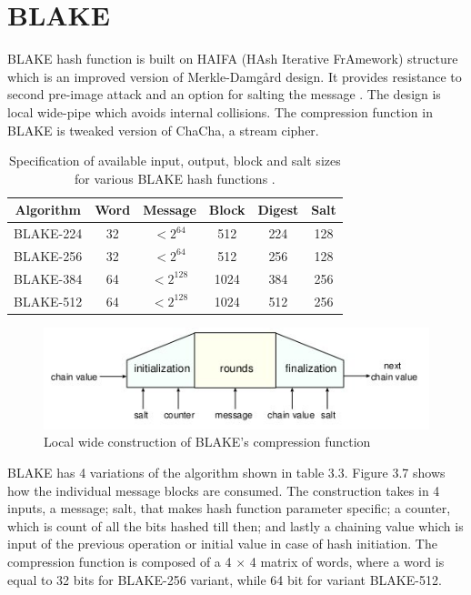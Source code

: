 \newpage
\section{BLAKE} 

BLAKE \cite{00002} hash function is built on HAIFA (HAsh Iterative FrAmework) structure \cite{00020} which is an improved
version of Merkle-Damg\r{a}rd design. It provides resistance to second pre-image attack and an option for salting the message
\cite{00021}. The design is local wide-pipe which avoids internal collisions. The compression function in BLAKE is tweaked
version of ChaCha, a stream cipher. 

\begin{table}[h]
  \begin{center}
    \begin{tabular}{ *{6}{c} } \hline
      Algorithm & Word & Message     & Block & Digest & Salt \\ \hline
      BLAKE-224 & 32   & $< 2^{64}$  & 512   & 224    & 128  \\
      BLAKE-256 & 32   & $< 2^{64}$  & 512   & 256    & 128  \\
      BLAKE-384 & 64   & $< 2^{128}$ & 1024  & 384    & 256  \\
      BLAKE-512 & 64   & $< 2^{128}$ & 1024  & 512    & 256  \\ \hline
    \end{tabular}
    \caption{Specification of available input, output, block and salt sizes for various BLAKE hash functions \cite{00002}.}
  \end{center}
\end{table}

\begin{figure}[h]
  \begin{center}
    \includegraphics[width=4.75in]{blakelocalwidepipeconstruction.jpg}
  \end{center}
  \caption{Local wide construction of BLAKE's compression function \cite{00002}}
  \label{fig:lab}
\end{figure}

BLAKE has 4 variations of the algorithm shown in table 3.3. Figure 3.7 shows how the individual message blocks are
consumed. The construction takes in 4 inputs, a message; salt, that makes hash function parameter specific; a
counter, which is count of all the bits hashed till then; and lastly a chaining value which is input of the previous 
operation or initial value in case of hash initiation. The compression function is composed of a 4 $\times$ 4 matrix 
of words, where a word is equal to 32 bits for BLAKE-256 variant, while 64 bit for variant BLAKE-512.

